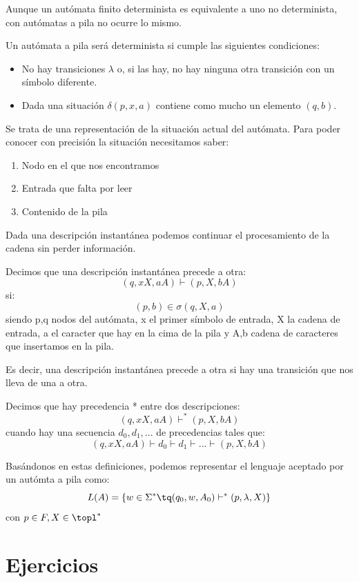 \documentclass{apuntes}
\begin{document}
\obs Aunque un autómata finito determinista es equivalente a uno no determinista, con autómatas a pila no ocurre lo mismo.

\begin{defn}
Un autómata a pila será determinista si cumple las siguientes condiciones:
\begin{itemize}
\item No hay transiciones $\lambda$ o, si las hay, no hay ninguna otra transición con un símbolo diferente.
\item Dada una situación $\delta (p,x,a)$ contiene como mucho un elemento $(q,b)$.
\end{itemize}
\end{defn}

\begin{defn}
Se trata de una representación de la situación actual del autómata. Para poder conocer con precisión la situación necesitamos saber:
\begin{enumerate}
\item Nodo en el que nos encontramos
\item Entrada que falta por leer
\item Contenido de la pila
\end{enumerate}

Dada una descripción instantánea podemos continuar el procesamiento de la cadena sin perder información.
\end{defn}

\begin{defn}
Decimos que una descripción instantánea precede a otra:
\[(q,xX,aA) \vdash (p, X, bA)\]
si:
\[(p,b) \in \sigma(q, X, a)\]
siendo p,q nodos del autómata, x el primer símbolo de entrada, X la cadena de entrada, a el caracter que hay en la cima de la pila y A,b cadena de caracteres que insertamos en la pila.

Es decir, una descripción instantánea precede a otra si hay una transición que nos lleva de una a otra.

\end{defn}

\begin{defn}[Precedecia *]
Decimos que hay precedencia * entre dos descripciones:
\[(q,xX,aA) \vdash^* (p, X, bA)\]
cuando hay una secuencia $d_0,d_1,...$ de precedencias tales que:
\[(q,xX,aA) \vdash d_0 \vdash d_1 \vdash ... \vdash (p, X, bA)\]
\end{defn}

Basándonos en estas definiciones, podemos representar el lenguaje aceptado por un autómta a pila como:
\[L(A) = \lbrace w \in \Sigma^* \tq (q_0, w, A_0) \vdash^* (p, \lambda, X)\rbrace\]
con $p\in F, X \in \topl^*$


\appendix
\chapter{Ejercicios}




\printindex
\end{document}
